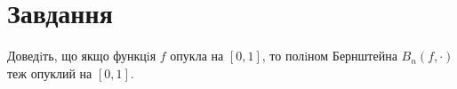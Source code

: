

\chapter{Завдання \theHchapter}

\begin{tcolorbox}[title=Завдання]
    Доведiть, що якщо функцiя $f$ опукла на $[0, 1]$, то полiном 
    Бернштейна $B_n(f, \cdot)$ теж опуклий на $[0, 1]$.
\end{tcolorbox}


